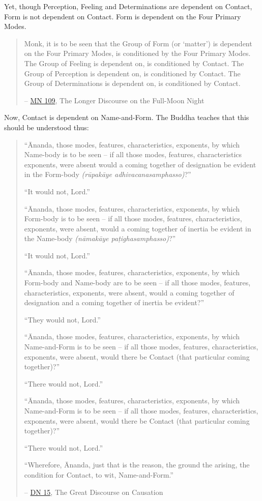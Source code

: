 Yet, though Perception, Feeling and Determinations are dependent on Contact, Form is not dependent on Contact. Form is dependent on the Four Primary Modes.

\begin{quote}
\label{ch-03-dependent}Monk, it is to be seen that the Group of Form (or `matter') is dependent on the Four Primary Modes, is conditioned by the Four Primary Modes. The Group of Feeling is dependent on, is conditioned by Contact. The Group of Perception is dependent on, is conditioned by Contact. The Group of Determinations is dependent on, is conditioned by Contact.

 -- \href{https://suttacentral.net/mn109/en/sujato}{MN 109}, The Longer Discourse on the Full-Moon Night
\end{quote}

Now, Contact is dependent on Name-and-Form. The Buddha teaches that this should be understood thus:

\begin{quote}
``Ānanda, those modes, features, characteristics, exponents, by which Name-body is to be seen -- if all those modes, features, characteristics exponents, were absent would a coming together of designation be evident in the Form-body \emph{(rūpakāye adhivacanasamphasso)}?''

``It would not, Lord.''

``Ānanda, those modes, features, characteristics, exponents, by which Form-body is to be seen -- if all those modes, features, characteristics, exponents, were absent, would a coming together of inertia be evident in the Name-body \emph{(nāmakāye paṭighasamphasso)}?''

``It would not, Lord.''

``Ānanda, those modes, features, characteristics, exponents, by which Form-body and Name-body are to be seen -- if all those modes, features, characteristics, exponents, were absent, would a coming together of designation and a coming together of inertia be evident?''

``They would not, Lord.''

``Ānanda, those modes, features, characteristics, exponents, by which Name-and-Form is to be seen -- if all those modes, features, characteristics, exponents, were absent, would there be Contact (that particular coming together)?''

``There would not, Lord.''

``Ānanda, those modes, features, characteristics, exponents, by which Name-and-Form is to be seen -- if all those modes, features, characteristics, exponents, were absent, would there be Contact (that particular coming together)?''

``There would not, Lord.''

``Wherefore, Ānanda, just that is the reason, the ground the arising, the condition for Contact, to wit, Name-and-Form.''

 -- \href{https://suttacentral.net/dn15/en/bodhi}{DN 15}, The Great Discourse on Causation
\end{quote}

